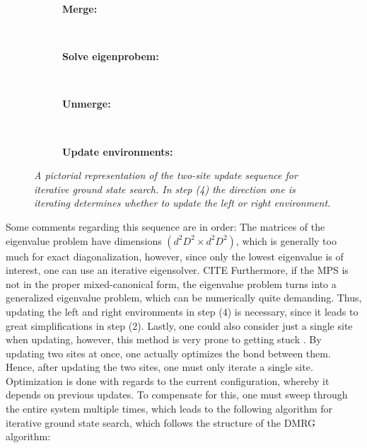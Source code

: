 \renewcommand{\thesubfigure}{\arabic{subfigure}}
\begin{figure}[h!]
	\centering
	\begin{subfigure}{\textwidth}
		\centering
		\caption{\textbf{Merge:}}
		
	\end{subfigure}\\[.8cm]
	
	\begin{subfigure}{\textwidth}
		\centering
		\caption{\textbf{Solve eigenprobem:}}
		
	\end{subfigure}\\[.8cm]

	\begin{subfigure}{\textwidth}
		\centering
		\caption{\textbf{Unmerge:}}
		
	\end{subfigure}\\[.8cm]

	\begin{subfigure}{\textwidth}
		\centering
		\caption{\textbf{Update environments:}}
		
	\end{subfigure}
	
	
	\caption{\textit{A pictorial representation of the two-site update sequence for iterative ground state search. In step (4) the direction one is iterating determines whether to update the left or right environment.}}
	\label{fig:twoSiteUpdate}
\end{figure}

Some comments regarding this sequence are in order: The matrices of the eigenvalue problem have dimensions $( d^2 D^2 \times d^2 D^2)$, which is generally too much for exact diagonalization, however, since only the lowest eigenvalue is of interest, one can use an iterative eigensolver. CITE Furthermore, if the MPS is not in the proper mixed-canonical form, the eigenvalue problem turns into a generalized eigenvalue problem, which can be numerically quite demanding. Thus, updating the left and right environments in step (4) is necessary, since it leads to great simplifications in step (2). Lastly, one could also consider just a single site when updating, however, this method is very prone to getting stuck \cite{WhiteSingleSite}. By updating two sites at once, one actually optimizes the bond between them. Hence, after updating the two sites, one must only iterate a single site. Optimization is done with regards to the current configuration, whereby it depends on previous updates. To compensate for this, one must sweep through the entire system multiple times, which leads to the following algorithm for iterative ground state search, which follows the structure of the DMRG algorithm:

